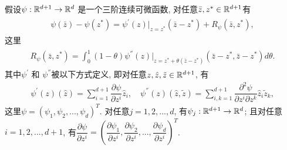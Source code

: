 假设$\psi  :\mathbb{R}^{d+1}\to \mathbb{R}^{d}$ 是一个三阶连续可微函数, 对任意$\bar{z},z^{*}\in \mathbb{R}^{d+1}$有
\begin{align*}
    \begin{split}
        \psi (\bar{z})-\psi (z^{*})=\psi ^{'}(z)|_{z=z^{*}}(\bar{z}-z^{*})+R_{\psi }(\bar{z},z^{*}),
    \end{split}
\end{align*}
这里
\begin{align*}
    \begin{split}
        R_{\psi }(\bar{z},z^{*})=\int_{0}^{1}(1-\theta)\psi ^{''}(z)|_{z=z^{*}+\theta (\bar{z}-z^{*})}(\bar{z}-z^{*},\bar{z}-z^{*})d\theta.
    \end{split}
\end{align*}
其中$\psi ^{'}$ 和 $\psi ^{''} $被以下方式定义, 即对任意$z,\hat{z},\tilde{z}\in \mathbb{R}^{d+1}$, 有
\begin{align*}
    \psi ^{'}(z)(\hat{z})=\sum_{i=1}^{d+1}\dfrac{\partial \psi }{\partial z^{i}}\hat{z}_{i},
    \quad \psi^{''}(z)(\hat{z},\tilde{z})=\sum_{i,k=1}^{d+1}\dfrac{\partial^{2} \psi  }{\partial z^{i}\partial z^{k}}\hat{z}_{i}\tilde{z}_{k},
\end{align*}
这里$\psi =(\psi _{1},\psi _{2},...,\psi _{d})^{T}$. 对任意$j=1,2,...,d$, 有$\psi_j:\mathbb{R}^{d+1}\to \mathbb{R}^{d}$; 且对任意$i=1,2,...,d+1$, 有$\dfrac{\partial \psi }{\partial z^{i}}=(\dfrac{\partial \psi _{1}}{\partial z^{i}},\dfrac{\partial \psi _{2}}{\partial z^{i}},...,\dfrac{\partial \psi _{d}}{\partial z^{i}})^{T}$.

